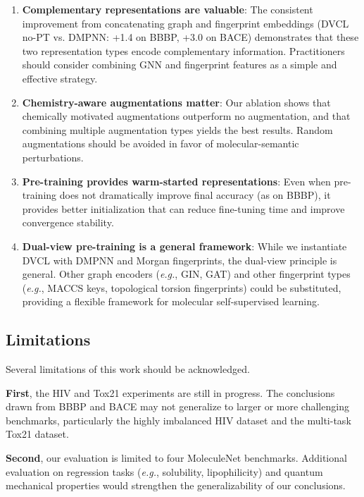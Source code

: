 \documentclass[a4paper,fleqn]{cas-sc}
\newcommand{\eg}{\textit{e.g.}}
\begin{document}
\begin{enumerate}
\item \textbf{Complementary representations are valuable}: The consistent improvement from concatenating graph and fingerprint embeddings (DVCL no-PT vs. DMPNN: +1.4 on BBBP, +3.0 on BACE) demonstrates that these two representation types encode complementary information. Practitioners should consider combining GNN and fingerprint features as a simple and effective strategy.

\item \textbf{Chemistry-aware augmentations matter}: Our ablation shows that chemically motivated augmentations outperform no augmentation, and that combining multiple augmentation types yields the best results. Random augmentations should be avoided in favor of molecular-semantic perturbations.

\item \textbf{Pre-training provides warm-started representations}: Even when pre-training does not dramatically improve final accuracy (as on BBBP), it provides better initialization that can reduce fine-tuning time and improve convergence stability.

\item \textbf{Dual-view pre-training is a general framework}: While we instantiate DVCL with DMPNN and Morgan fingerprints, the dual-view principle is general. Other graph encoders (\eg, GIN, GAT) and other fingerprint types (\eg, MACCS keys, topological torsion fingerprints) could be substituted, providing a flexible framework for molecular self-supervised learning.
\end{enumerate}

\subsection{Limitations}

Several limitations of this work should be acknowledged.

\textbf{First}, the HIV and Tox21 experiments are still in progress. The conclusions drawn from BBBP and BACE may not generalize to larger or more challenging benchmarks, particularly the highly imbalanced HIV dataset and the multi-task Tox21 dataset.

\textbf{Second}, our evaluation is limited to four MoleculeNet benchmarks. Additional evaluation on regression tasks (\eg, solubility, lipophilicity) and quantum mechanical properties would strengthen the generalizability of our conclusions.
\end{document}
